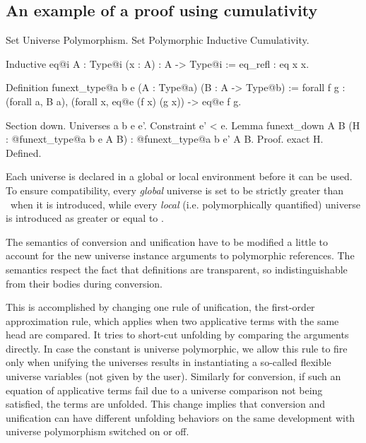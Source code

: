 \subsection*{An example of a proof using cumulativity}

\begin{coq_example}
Set Universe Polymorphism.
Set Polymorphic Inductive Cumulativity.

Inductive eq@{i} {A : Type@{i}} (x : A) : A -> Type@{i} := eq_refl : eq x x.

Definition funext_type@{a b e} (A : Type@{a}) (B : A -> Type@{b})
  := forall f g : (forall a, B a),
    (forall x, eq@{e} (f x) (g x))
    -> eq@{e} f g.

Section down.
  Universes a b e e'.
  Constraint e' < e.
  Lemma funext_down {A B}
    (H : @funext_type@{a b e} A B) : @funext_type@{a b e'} A B.
  Proof.
    exact H.
  Defined.
\end{coq_example}


Each universe is declared in a global or local environment before it can
be used. To ensure compatibility, every \emph{global} universe is set to
be strictly greater than \Set~when it is introduced, while every
\emph{local} (i.e. polymorphically quantified) universe is introduced as
greater or equal to \Set.


The semantics of conversion and unification have to be modified a little
to account for the new universe instance arguments to polymorphic
references. The semantics respect the fact that definitions are
transparent, so indistinguishable from their bodies during conversion.

This is accomplished by changing one rule of unification, the
first-order approximation rule, which applies when two applicative terms
with the same head are compared. It tries to short-cut unfolding by
comparing the arguments directly. In case the constant is universe
polymorphic, we allow this rule to fire only when unifying the universes
results in instantiating a so-called flexible universe variables (not
given by the user). Similarly for conversion, if such an equation of
applicative terms fail due to a universe comparison not being satisfied,
the terms are unfolded. This change implies that conversion and
unification can have different unfolding behaviors on the same
development with universe polymorphism switched on or off.

